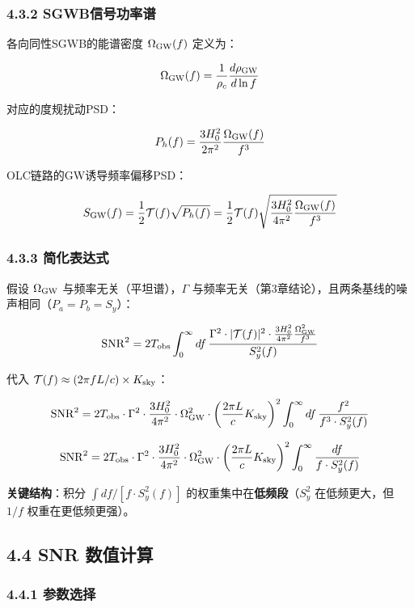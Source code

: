 \documentclass[12pt,a4paper]{article}
\begin{document}
\subsubsection{4.3.2 SGWB信号功率谱}


各向同性SGWB的能谱密度 $\Omega_{\rm GW}(f)$ 定义为：

$$\Omega_{\rm GW}(f) = \frac{1}{\rho_c} \frac{d\rho_{\rm GW}}{d\ln f}$$

对应的度规扰动PSD：

$$P_h(f) = \frac{3H_0^2}{2\pi^2} \frac{\Omega_{\rm GW}(f)}{f^3}$$

OLC链路的GW诱导频率偏移PSD：

$$S_{\rm GW}(f) = \frac{1}{2} \mathcal{T}(f) \sqrt{P_h(f)} = \frac{1}{2} \mathcal{T}(f) \sqrt{\frac{3H_0^2}{4\pi^2} \frac{\Omega_{\rm GW}(f)}{f^3}}$$

\subsubsection{4.3.3 简化表达式}


假设 $\Omega_{\rm GW}$ 与频率无关（平坦谱），$\Gamma$ 与频率无关（第3章结论），且两条基线的噪声相同（$P_a = P_b = S_y$）：

$${\rm SNR}^2 = 2 T_{\rm obs} \int_0^\infty df\, \frac{\Gamma^2 \cdot |\mathcal{T}(f)|^2 \cdot \frac{3H_0^2}{4\pi^2} \frac{\Omega_{\rm GW}^2}{f^3}}{S_y^2(f)}$$

代入 $\mathcal{T}(f) \approx (2\pi f L/c) \times K_{\rm sky}$：

$${\rm SNR}^2 = 2 T_{\rm obs} \cdot \Gamma^2 \cdot \frac{3H_0^2}{4\pi^2} \cdot \Omega_{\rm GW}^2 \cdot \left(\frac{2\pi L}{c} K_{\rm sky}\right)^2 \int_0^\infty df\, \frac{f^2}{f^3 \cdot S_y^2(f)}$$

$${\rm SNR}^2 = 2 T_{\rm obs} \cdot \Gamma^2 \cdot \frac{3H_0^2}{4\pi^2} \cdot \Omega_{\rm GW}^2 \cdot \left(\frac{2\pi L}{c} K_{\rm sky}\right)^2 \int_0^\infty \frac{df}{f \cdot S_y^2(f)}$$

\textbf{关键结构}：积分 $\int df / [f \cdot S_y^2(f)]$ 的权重集中在\textbf{低频段}（$S_y^2$ 在低频更大，但 $1/f$ 权重在更低频更强）。

\subsection{4.4 SNR 数值计算}


\subsubsection{4.4.1 参数选择}
\end{document}
